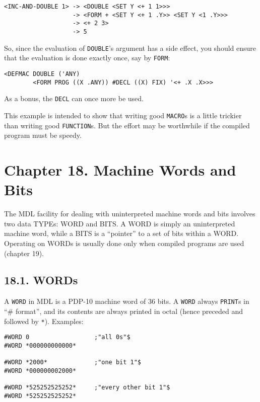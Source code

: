 \documentclass[a4paper,]{article}
\begin{document}
\begin{verbatim}
<INC-AND-DOUBLE 1> -> <DOUBLE <SET Y <+ 1 1>>>
                   -> <FORM + <SET Y <+ 1 .Y>> <SET Y <1 .Y>>>
                   -> <+ 2 3>
                   -> 5
\end{verbatim}

So, since the evaluation of \texttt{DOUBLE}'s argument has a side effect, you should ensure that the evaluation is done
exactly once, say by \texttt{FORM}:

\begin{verbatim}
<DEFMAC DOUBLE ('ANY)
        <FORM PROG ((X .ANY)) #DECL ((X) FIX) '<+ .X .X>>>
\end{verbatim}

As a bonus, the \texttt{DECL} can once more be used.

This example is intended to show that writing good \texttt{MACRO}s is a little trickier than writing good
\texttt{FUNCTION}s. But the effort may be worthwhile if the compiled program must be speedy.

\section{Chapter 18. Machine Words and Bits}\label{chapter-18.-machine-words-and-bits}

The MDL facility for dealing with uninterpreted machine words and bits involves two data TYPEs: WORD and BITS. A WORD is
simply an uninterpreted machine word, while a BITS is a ``pointer'' to a set of bits within a WORD. Operating on WORDs is
usually done only when compiled programs are used (chapter 19).

\subsection{18.1. WORDs}\label{words}

A \texttt{WORD} in MDL is a PDP-10 machine word of 36 bits. A \texttt{WORD} always \texttt{PRINT}s in ``\# format'', and
its contents are always printed in octal (hence preceded and followed by \texttt{*}\index{\texttt{*}}). Examples:

\begin{verbatim}
#WORD 0                  ;"all 0s"$
#WORD *000000000000*

#WORD *2000*             ;"one bit 1"$
#WORD *000000002000*

#WORD *525252525252*     ;"every other bit 1"$
#WORD *525252525252*
\end{verbatim}
\end{document}
